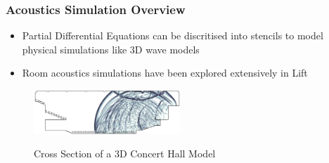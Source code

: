 \documentclass[10pt]{beamer}
\begin{document}
\begin{frame}
\frametitle{Acoustics Simulation Overview}
\vspace{.2cm}
\begin{itemize}
    \item Partial Differential Equations can be discritised into stencils to model physical simulations like 3D wave models 
    \item Room acoustics simulations have been explored extensively in Lift 
\end{itemize}
\vspace{-1.2cm}
        \begin{block}{}
            \begin{center}
            \vspace{.7cm}
            \begin{figure}
            \begin{center} \includegraphics[width=5.5cm]{../images/crosssection.pdf}\\\caption{\footnotesize{Cross Section of a 3D Concert Hall Model}}\end{center}
            \end{figure}
        \end{center}
        \end{block}
\end{frame}


\appendix
\end{document}
